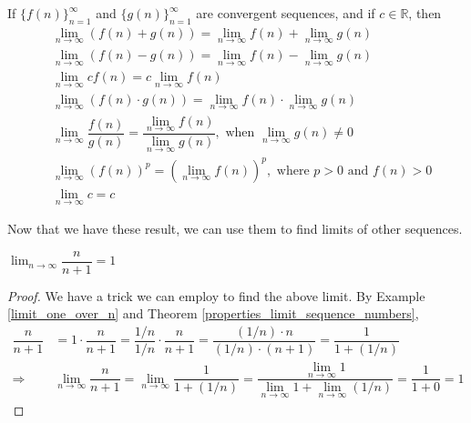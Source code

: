 \begin{theorem}
If $\{f(n)\}_{n=1}^{\infty}$ and $\{g(n)\}_{n=1}^{\infty}$ are convergent sequences, and if $c \in \mathbb{R}$, then
\begin{align*}
    &\lim_{n \longrightarrow \infty} (f(n) + g(n)) = \lim_{n \longrightarrow \infty} f(n) + \lim_{n \longrightarrow \infty} g(n) \\[2ex]
    &\lim_{n \longrightarrow \infty}(f(n) - g(n)) = \lim_{n \longrightarrow \infty} f(n) - \lim_{n \longrightarrow \infty} g(n)\\[2ex]
    &\lim_{n \longrightarrow \infty} cf(n) = c\lim_{n \longrightarrow \infty} f(n)\\[2ex]
    &\lim_{n \longrightarrow \infty} (f(n) \cdot g(n)) = \lim_{n \longrightarrow \infty} f(n) \cdot \lim_{n \longrightarrow \infty} g(n)\\[2ex]
    &\lim_{n \longrightarrow \infty}\dfrac{f(n)}{g(n)} = \dfrac{\lim_{n \longrightarrow \infty} f(n)}{\lim_{n \longrightarrow \infty} g(n)}, \hspace{4pt} \text{when} \hspace{4pt} \lim_{n \longrightarrow \infty} g(n) \neq 0\\[2ex]
    &\lim_{n \longrightarrow \infty} (f(n))^{p} = (\lim_{n \longrightarrow \infty} f(n))^{p}, \hspace{4pt} \text{where} \hspace{4pt} p > 0 \hspace{4pt} \text{and} \hspace{4pt} f(n) > 0\\[2ex]
    &\lim_{n \longrightarrow \infty} c = c
\end{align*}
\label{properties_limit_sequence_numbers}
\end{theorem}

Now that we have these result, we can use them to find limits of other sequences.

\begin{example}
$\lim_{n \longrightarrow \infty} \dfrac{n}{n+1} = 1$
\begin{proof}
We have a trick we can employ to find the above limit. By Example \ref{limit_one_over_n} and Theorem \ref{properties_limit_sequence_numbers},
\begin{align*}
    \dfrac{n}{n+1} &= 1 \cdot \dfrac{n}{n+1}
    = \dfrac{1/n}{1/n} \cdot \dfrac{n}{n+1}
    = \dfrac{(1/n) \cdot n}{(1/n) \cdot (n+1)}
    = \dfrac{1}{1 + (1/n)}\\[2ex]
    \Longrightarrow &\lim_{n \longrightarrow \infty} \dfrac{n}{n+1}
    = \lim_{n \longrightarrow \infty} \dfrac{1}{1+(1/n)}
    = \dfrac{\lim_{n \longrightarrow \infty}1}{\lim_{n \longrightarrow \infty}1 + \lim_{n \longrightarrow \infty}(1/n)}
    = \dfrac{1}{1 + 0} = 1
\end{align*}
\end{proof}
\end{example}

